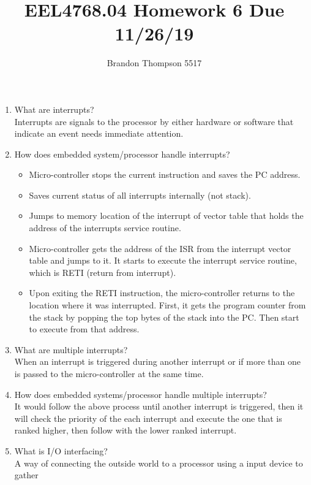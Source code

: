 \documentclass[a4paper]{article}
\begin{document}
	\title{EEL4768.04 Homework 6 Due 11/26/19}
	\author{Brandon Thompson 5517}
	\maketitle

	\begin{enumerate}
		\item What are interrupts?\\
			Interrupts are signals to the processor by either hardware or software that
			indicate an event needs immediate attention.
		\item How does embedded system/processor handle interrupts?
			\begin{itemize}
				\item Micro-controller stops the current instruction and saves the PC address.
				\item Saves current status of all interrupts internally (not stack).
				\item Jumps to memory location of the interrupt of vector table that holds
					the address of the interrupts service routine.
				\item Micro-controller gets the address of the ISR from the interrupt vector
					table and jumps to it. It starts to execute the interrupt service
					routine, which is RETI (return from interrupt).
				\item Upon exiting the RETI instruction, the micro-controller returns to the
					location where it was interrupted. First, it gets the program counter
					from the stack by popping the top bytes of the stack into the PC.
					Then start to execute from that address.
			\end{itemize}
		\item What are multiple interrupts?\\
			When an interrupt is triggered during another interrupt or if more than one is passed
			to the micro-controller at the same time.
		\item How does embedded systems/processor handle multiple interrupts?\\
			It would follow the above process until another interrupt is triggered, then it will
			check the priority of the each interrupt and execute the one that is ranked higher,
			then follow with the lower ranked interrupt.
		\item What is I/O interfacing?\\
			A way of connecting the outside world to a processor using a input device to gather

\end{enumerate}
\end{document}
